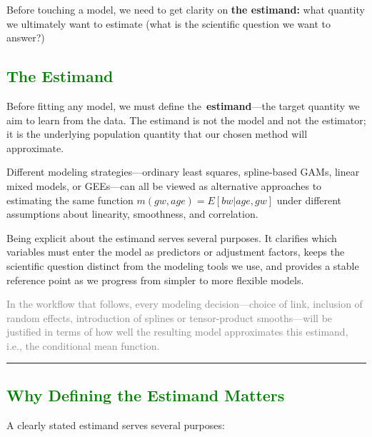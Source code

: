 \documentclass[
  letterpaper,
  DIV=11,
  numbers=noendperiod]{scrreprt}
\begin{document}
\markright{\textcolor{purple}{1. Define the Estimand}}

Before touching a model, we need to get clarity on \textbf{the
estimand:} what quantity we ultimately want to estimate (what is the
scientific question we want to answer?)

\hypertarget{section-50}{%
\subsection*{\texorpdfstring{\textcolor{green}{The Estimand}}{}}\label{section-50}}

Before fitting any model, we must define the~\textbf{estimand}---the
target quantity we aim to learn from the data. The estimand is not the
model and not the estimator; it is the underlying population quantity
that our chosen method will approximate.

Different modeling strategies---ordinary least squares, spline-based
GAMs, linear mixed models, or GEEs---can all be viewed as alternative
approaches to estimating the same function \(m(gw,age) = E[bw|age, gw]\)
under different assumptions about linearity, smoothness, and
correlation.

Being explicit about the estimand serves several purposes. It clarifies
which variables must enter the model as predictors or adjustment
factors, keeps the scientific question distinct from the modeling tools
we use, and provides a stable reference point as we progress from
simpler to more flexible models.

\textcolor{gray}{In the workflow that follows, every modeling decision---choice of link, inclusion of random effects, introduction of splines or tensor-product smooths---will be justified in terms of how well the resulting model approximates this estimand, i.e., the conditional mean function.}

\begin{center}\rule{0.5\linewidth}{0.5pt}\end{center}

\hypertarget{section-51}{%
\subsection*{\texorpdfstring{\textcolor{green}{Why Defining the Estimand Matters}}{}}\label{section-51}}

A clearly stated estimand serves several purposes:
\end{document}
